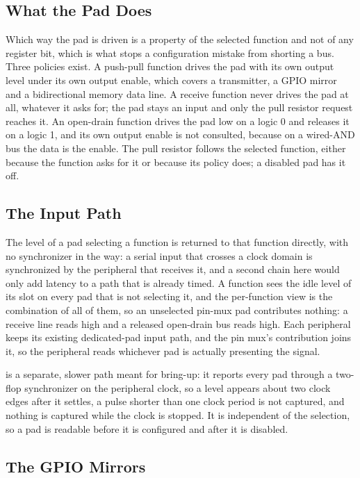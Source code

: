 \subsection{What the Pad Does}

Which way the pad is driven is a property of the selected function and not of any register bit, which is what stops a configuration mistake from shorting a bus. Three policies exist. A push-pull function drives the pad with its own output level under its own output enable, which covers a transmitter, a GPIO mirror and a bidirectional memory data line. A receive function never drives the pad at all, whatever it asks for; the pad stays an input and only the pull resistor request reaches it. An open-drain function drives the pad low on a logic 0 and releases it on a logic 1, and its own output enable is not consulted, because on a wired-AND bus the data is the enable. The pull resistor follows the selected function, either because the function asks for it or because its policy does; a disabled pad has it off.

\subsection{The Input Path}

The level of a pad selecting a function is returned to that function directly, with no synchronizer in the way: a serial input that crosses a clock domain is synchronized by the peripheral that receives it, and a second chain here would only add latency to a path that is already timed. A function sees the idle level of its slot on every pad that is not selecting it, and the per-function view is the combination of all of them, so an unselected pin-mux pad contributes nothing: a receive line reads high and a released open-drain bus reads high. Each peripheral keeps its existing dedicated-pad input path, and the pin mux's contribution joins it, so the peripheral reads whichever pad is actually presenting the signal.

 is a separate, slower path meant for bring-up: it reports every pad through a two-flop synchronizer on the peripheral clock, so a level appears about two clock edges after it settles, a pulse shorter than one clock period is not captured, and nothing is captured while the clock is stopped. It is independent of the selection, so a pad is readable before it is configured and after it is disabled.

\subsection{The GPIO Mirrors}

